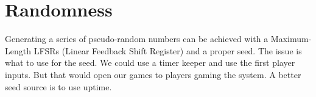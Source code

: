 \section{Randomness}
Generating a series of pseudo-random numbers can be achieved with a Maximum-Length LFSRs (Linear Feedback Shift Register) and a proper seed. The issue is what to use for the seed. We could use a timer keeper and use the first player inputs. But that would open our games to players gaming the system. A better seed source is to use uptime.


